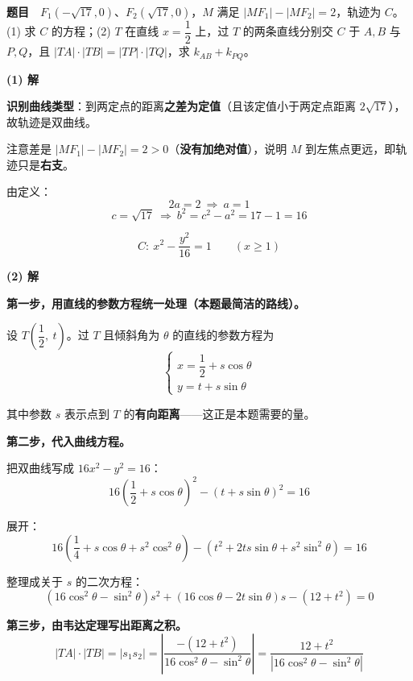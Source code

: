 \par\medskip


\textbf{题目}　$F_1\left(-\sqrt{17},0\right)$、$F_2\left(\sqrt{17},0\right)$，$M$ 满足 $\left|MF_1\right|-\left|MF_2\right|=2$，轨迹为 $C$。(1) 求 $C$ 的方程；(2) $T$ 在直线 $x=\dfrac12$ 上，过 $T$ 的两条直线分别交 $C$ 于 $A,B$ 与 $P,Q$，且 $|TA|\cdot|TB|=|TP|\cdot|TQ|$，求 $k_{AB}+k_{PQ}$。

\par\medskip

\textbf{(1) 解}

\textbf{识别曲线类型}：到两定点的距离\textbf{之差为定值}（且该定值小于两定点距离 $2\sqrt{17}$），故轨迹是双曲线。

注意差是 $\left|MF_1\right|-\left|MF_2\right|=2>0$（\textbf{没有加绝对值}），说明 $M$ 到左焦点更远，即轨迹只是\textbf{右支}。

由定义：
\[2a=2\ \Longrightarrow\ a=1\]
\[c=\sqrt{17}\ \Longrightarrow\ b^{2}=c^{2}-a^{2}=17-1=16\]

\[C:\ x^{2}-\frac{y^{2}}{16}=1\qquad(x\ge1)\]

\par\medskip

\textbf{(2) 解}

\textbf{第一步，用直线的参数方程统一处理（本题最简洁的路线）。}

设 $T\left(\dfrac12,\ t\right)$。过 $T$ 且倾斜角为 $\theta$ 的直线的参数方程为
\[\begin{cases}x=\dfrac12+s\cos\theta\\ y=t+s\sin\theta\end{cases}\]

其中参数 $s$ 表示点到 $T$ 的\textbf{有向距离}——这正是本题需要的量。

\textbf{第二步，代入曲线方程。}

把双曲线写成 $16x^{2}-y^{2}=16$：
\[16\left(\frac12+s\cos\theta\right)^{2}-\left(t+s\sin\theta\right)^{2}=16\]

展开：
\[16\left(\frac14+s\cos\theta+s^{2}\cos^{2}\theta\right)-\left(t^{2}+2ts\sin\theta+s^{2}\sin^{2}\theta\right)=16\]

整理成关于 $s$ 的二次方程：
\[\left(16\cos^{2}\theta-\sin^{2}\theta\right)s^{2}+\left(16\cos\theta-2t\sin\theta\right)s-\left(12+t^{2}\right)=0\]

\textbf{第三步，由韦达定理写出距离之积。}
\[|TA|\cdot|TB|=\left|s_1s_2\right|=\left|\frac{-\left(12+t^{2}\right)}{16\cos^{2}\theta-\sin^{2}\theta}\right|=\frac{12+t^{2}}{\left|16\cos^{2}\theta-\sin^{2}\theta\right|}\]

